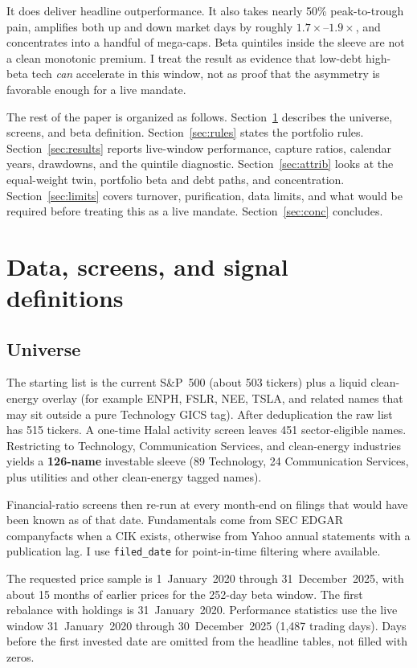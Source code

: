 \documentclass[11pt,letterpaper]{article}
\begin{document}
It does deliver headline outperformance. It also takes nearly 50\% peak-to-trough pain, amplifies both up and down market days by roughly $1.7\times$--$1.9\times$, and concentrates into a handful of mega-caps. Beta quintiles inside the sleeve are not a clean monotonic premium. I treat the result as evidence that low-debt high-beta tech \emph{can} accelerate in this window, not as proof that the asymmetry is favorable enough for a live mandate.

The rest of the paper is organized as follows. Section~\ref{sec:data} describes the universe, screens, and beta definition. Section~\ref{sec:rules} states the portfolio rules. Section~\ref{sec:results} reports live-window performance, capture ratios, calendar years, drawdowns, and the quintile diagnostic. Section~\ref{sec:attrib} looks at the equal-weight twin, portfolio beta and debt paths, and concentration. Section~\ref{sec:limits} covers turnover, purification, data limits, and what would be required before treating this as a live mandate. Section~\ref{sec:conc} concludes.

\section{Data, screens, and signal definitions}
\label{sec:data}

\subsection{Universe}

The starting list is the current S\&P~500 (about 503 tickers) plus a liquid clean-energy overlay (for example ENPH, FSLR, NEE, TSLA, and related names that may sit outside a pure Technology GICS tag). After deduplication the raw list has 515 tickers. A one-time Halal activity screen leaves 451 sector-eligible names. Restricting to Technology, Communication Services, and clean-energy industries yields a \textbf{126-name} investable sleeve (89 Technology, 24 Communication Services, plus utilities and other clean-energy tagged names).

Financial-ratio screens then re-run at every month-end on filings that would have been known as of that date. Fundamentals come from SEC EDGAR companyfacts when a CIK exists, otherwise from Yahoo annual statements with a publication lag. I use \texttt{filed\_date} for point-in-time filtering where available.

The requested price sample is 1~January~2020 through 31~December~2025, with about 15 months of earlier prices for the 252-day beta window. The first rebalance with holdings is 31~January~2020. Performance statistics use the live window 31~January~2020 through 30~December~2025 (1{,}487 trading days). Days before the first invested date are omitted from the headline tables, not filled with zeros.
\end{document}
